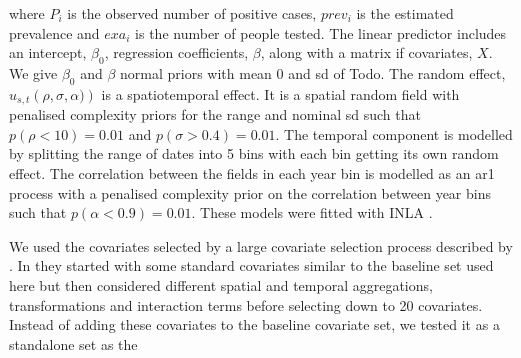 \documentclass{bmcart}
\begin{document}
where $P_i$ is the observed number of positive cases, $prev_i$ is the estimated prevalence and $exa_i$ is the number of people tested.
The linear predictor includes an intercept, $\beta_0$, regression coefficients, $\beta$, along with a matrix if covariates, $X$.
We give $\beta_0$ and $\beta$ normal priors with mean 0 and sd of Todo.
The random effect, $u_{s, t}\left(\rho, \sigma, \alpha)\right)$ is a spatiotemporal effect.
It is a spatial random field with penalised complexity priors \cite{fuglstad2018constructing} for the range and nominal sd such that $p(\rho<10) = 0.01$ and $p(\sigma > 0.4) = 0.01$.
The temporal component is modelled by splitting the range of dates into 5 bins with each bin getting its own random effect.
The correlation between the fields in each year bin is modelled as an ar1 process with a penalised complexity prior on the correlation between year bins such that $p(\alpha < 0.9) = 0.01$.
These models were fitted with INLA \cite{inla}.
























We used the covariates selected by a large covariate selection process described by \cite{weiss2015re}.
In \cite{weiss2015re} they started with some standard covariates similar to the baseline set used here but then considered different spatial and temporal aggregations, transformations and interaction terms before selecting down to 20 covariates.
Instead of adding these covariates to the baseline covariate set, we tested it as a standalone set as the



\end{document}
